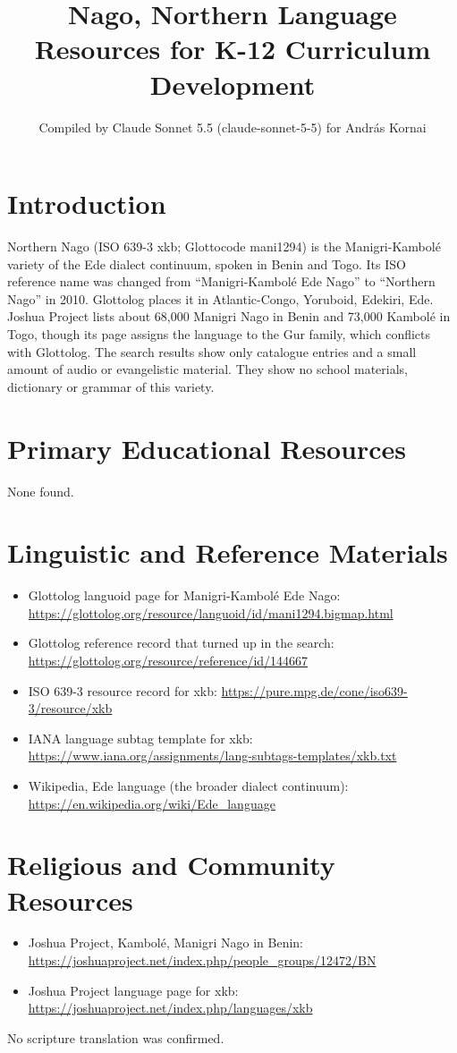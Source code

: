 \documentclass[12pt]{article}
\title{Nago, Northern Language Resources for K-12 Curriculum Development}
\author{Compiled by Claude Sonnet 5.5 (claude-sonnet-5-5) for Andr\'as Kornai}
\date{}
\begin{document}
\maketitle

\section{Introduction}
Northern Nago (ISO 639-3 xkb; Glottocode mani1294) is the Manigri-Kambol\'e variety of the Ede dialect continuum, spoken in Benin and Togo. Its ISO reference name was changed from ``Manigri-Kambol\'e Ede Nago'' to ``Northern Nago'' in 2010. Glottolog places it in Atlantic-Congo, Yoruboid, Edekiri, Ede. Joshua Project lists about 68,000 Manigri Nago in Benin and 73,000 Kambol\'e in Togo, though its page assigns the language to the Gur family, which conflicts with Glottolog. The search results show only catalogue entries and a small amount of audio or evangelistic material. They show no school materials, dictionary or grammar of this variety.

\section{Primary Educational Resources}
None found.

\section{Linguistic and Reference Materials}
\begin{itemize}
\item Glottolog languoid page for Manigri-Kambol\'e Ede Nago: \url{https://glottolog.org/resource/languoid/id/mani1294.bigmap.html}
\item Glottolog reference record that turned up in the search: \url{https://glottolog.org/resource/reference/id/144667}
\item ISO 639-3 resource record for xkb: \url{https://pure.mpg.de/cone/iso639-3/resource/xkb}
\item IANA language subtag template for xkb: \url{https://www.iana.org/assignments/lang-subtags-templates/xkb.txt}
\item Wikipedia, Ede language (the broader dialect continuum): \url{https://en.wikipedia.org/wiki/Ede_language}
\end{itemize}

\section{Religious and Community Resources}
\begin{itemize}
\item Joshua Project, Kambol\'e, Manigri Nago in Benin: \url{https://joshuaproject.net/index.php/people_groups/12472/BN}
\item Joshua Project language page for xkb: \url{https://joshuaproject.net/index.php/languages/xkb}
\end{itemize}
No scripture translation was confirmed.
\end{document}
